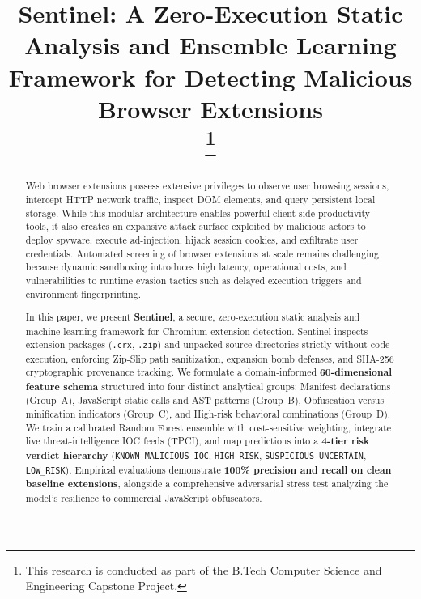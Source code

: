 \documentclass[conference]{IEEEtran}
\begin{document}
\title{Sentinel: A Zero-Execution Static Analysis and Ensemble Learning Framework for Detecting Malicious Browser Extensions\\
\thanks{This research is conducted as part of the B.Tech Computer Science and Engineering Capstone Project.}
}

\author{
\and
{}
}

\maketitle

\begin{abstract}
Web browser extensions possess extensive privileges to observe user browsing sessions, intercept HTTP network traffic, inspect DOM elements, and query persistent local storage. While this modular architecture enables powerful client-side productivity tools, it also creates an expansive attack surface exploited by malicious actors to deploy spyware, execute ad-injection, hijack session cookies, and exfiltrate user credentials. Automated screening of browser extensions at scale remains challenging because dynamic sandboxing introduces high latency, operational costs, and vulnerabilities to runtime evasion tactics such as delayed execution triggers and environment fingerprinting.

In this paper, we present \textbf{Sentinel}, a secure, zero-execution static analysis and machine-learning framework for Chromium extension detection. Sentinel inspects extension packages (\texttt{.crx}, \texttt{.zip}) and unpacked source directories strictly without code execution, enforcing Zip-Slip path sanitization, expansion bomb defenses, and SHA-256 cryptographic provenance tracking. We formulate a domain-informed \textbf{60-dimensional feature schema} structured into four distinct analytical groups: Manifest declarations (Group~A), JavaScript static calls and AST patterns (Group~B), Obfuscation versus minification indicators (Group~C), and High-risk behavioral combinations (Group~D). We train a calibrated Random Forest ensemble with cost-sensitive weighting, integrate live threat-intelligence IOC feeds (TPCI), and map predictions into a \textbf{4-tier risk verdict hierarchy} (\texttt{KNOWN\_MALICIOUS\_IOC}, \texttt{HIGH\_RISK}, \texttt{SUSPICIOUS\_UNCERTAIN}, \texttt{LOW\_RISK}). Empirical evaluations demonstrate \textbf{100\% precision and recall on clean baseline extensions}, alongside a comprehensive adversarial stress test analyzing the model's resilience to commercial JavaScript obfuscators.
\end{abstract}
\end{document}
